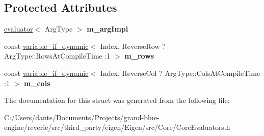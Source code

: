 \subsection*{Protected Attributes}
\begin{DoxyCompactItemize}
\item 
\mbox{\label{struct_eigen_1_1internal_1_1unary__evaluator_3_01_reverse_3_01_arg_type_00_01_direction_01_4_01_4_a19b57d46a080357bb252bf9f1e12b2c3}} 
\mbox{\hyperlink{struct_eigen_1_1internal_1_1evaluator}{evaluator}}$<$ Arg\+Type $>$ {\bfseries m\+\_\+arg\+Impl}
\item 
\mbox{\label{struct_eigen_1_1internal_1_1unary__evaluator_3_01_reverse_3_01_arg_type_00_01_direction_01_4_01_4_a604579b692f62a1f21ccc48eda3b8bcf}} 
const \mbox{\hyperlink{class_eigen_1_1internal_1_1variable__if__dynamic}{variable\+\_\+if\+\_\+dynamic}}$<$ Index, Reverse\+Row ? Arg\+Type\+::\+Rows\+At\+Compile\+Time \+:1 $>$ {\bfseries m\+\_\+rows}
\item 
\mbox{\label{struct_eigen_1_1internal_1_1unary__evaluator_3_01_reverse_3_01_arg_type_00_01_direction_01_4_01_4_af26407d23d3c51cc1cd6c6ba81425fc8}} 
const \mbox{\hyperlink{class_eigen_1_1internal_1_1variable__if__dynamic}{variable\+\_\+if\+\_\+dynamic}}$<$ Index, Reverse\+Col ? Arg\+Type\+::\+Cols\+At\+Compile\+Time \+:1 $>$ {\bfseries m\+\_\+cols}
\end{DoxyCompactItemize}


The documentation for this struct was generated from the following file\+:\begin{DoxyCompactItemize}
\item 
C\+:/\+Users/dante/\+Documents/\+Projects/grand-\/blue-\/engine/reverie/src/third\+\_\+party/eigen/\+Eigen/src/\+Core/Core\+Evaluators.\+h\end{DoxyCompactItemize}
